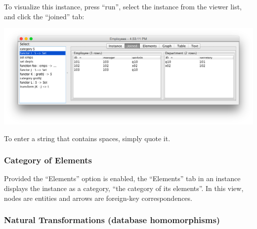 \documentclass[12pt]{article}
\begin{document}
To visualize this instance, press ``run'', select the instance from the viewer list, and click the ``joined'' tab:

\begin{center}
\includegraphics[width=5.5in]{instance}
\end{center}

To enter a string that contains spaces, simply quote it.  

\subsubsection{Category of Elements}

Provided the ``Elements'' option is enabled, the ``Elements'' tab in an instance displays the instance as a category, ``the category of its elements''.  In this view, nodes are entities and arrows are foreign-key correspondences. 

\subsubsection{Natural Transformations (database homomorphisms)}
\end{document}
